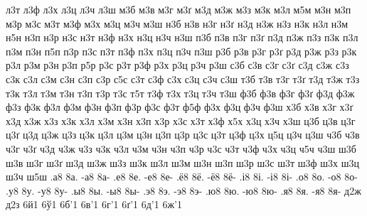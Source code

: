 {л3т
л3ф
л3х
л3ц
л3ч
л3ш
м3б
м3в
м3г
м3ґ
м3д
м3ж
м3з
м3к
м3л
м5м
м3н
м3п
м3р
м3с
м3т
м3ф
м3х
м3ц
м3ч
м3ш
н3б
н3в
н3г
н3ґ
н3д
н3ж
н3з
н3к
н3л
н3м
н5н
н3п
н3р
н3с
н3т
н3ф
н3х
н3ц
н3ч
н3ш
п3б
п3в
п3г
п3ґ
п3д
п3ж
п3з
п3к
п3л
п3м
п3н
п5п
п3р
п3с
п3т
п3ф
п3х
п3ц
п3ч
п3ш
р3б
р3в
р3г
р3ґ
р3д
р3ж
р3з
р3к
р3л
р3м
р3н
р3п
р5р
р3с
р3т
р3ф
р3х
р3ц
р3ч
р3ш
с3б
с3в
с3г
с3ґ
с3д
с3ж
с3з
с3к
с3л
с3м
с3н
с3п
с3р
с5с
с3т
с3ф
с3х
с3ц
с3ч
с3ш
т3б
т3в
т3г
т3ґ
т3д
т3ж
т3з
т3к
т3л
т3м
т3н
т3п
т3р
т3с
т5т
т3ф
т3х
т3ц
т3ч
т3ш
ф3б
ф3в
ф3г
ф3ґ
ф3д
ф3ж
ф3з
ф3к
ф3л
ф3м
ф3н
ф3п
ф3р
ф3с
ф3т
ф5ф
ф3х
ф3ц
ф3ч
ф3ш
х3б
х3в
х3г
х3ґ
х3д
х3ж
х3з
х3к
х3л
х3м
х3н
х3п
х3р
х3с
х3т
х3ф
х5х
х3ц
х3ч
х3ш
ц3б
ц3в
ц3г
ц3ґ
ц3д
ц3ж
ц3з
ц3к
ц3л
ц3м
ц3н
ц3п
ц3р
ц3с
ц3т
ц3ф
ц3х
ц5ц
ц3ч
ц3ш
ч3б
ч3в
ч3г
ч3ґ
ч3д
ч3ж
ч3з
ч3к
ч3л
ч3м
ч3н
ч3п
ч3р
ч3с
ч3т
ч3ф
ч3х
ч3ц
ч5ч
ч3ш
ш3б
ш3в
ш3г
ш3ґ
ш3д
ш3ж
ш3з
ш3к
ш3л
ш3м
ш3н
ш3п
ш3р
ш3с
ш3т
ш3ф
ш3х
ш3ц
ш3ч
ш5ш
%
%
%
.а8 8а. -а8 8а-
.е8 8е. -е8 8е-
.ё8 8ё. -ё8 8ё-
.і8 8і. -і8 8і-
.о8 8о. -о8 8о-
.у8 8у. -у8 8у-
.ы8 8ы. -ы8 8ы-
.э8 8э. -э8 8э-
.ю8 8ю. -ю8 8ю-
.я8 8я. -я8 8я-
%
%
%
%
%
д2ж
д2з
%
%
%
6й1
6ў1
%
%
%
6б'1
6в'1
6г'1
6ґ'1
6д'1
6ж'1
}
